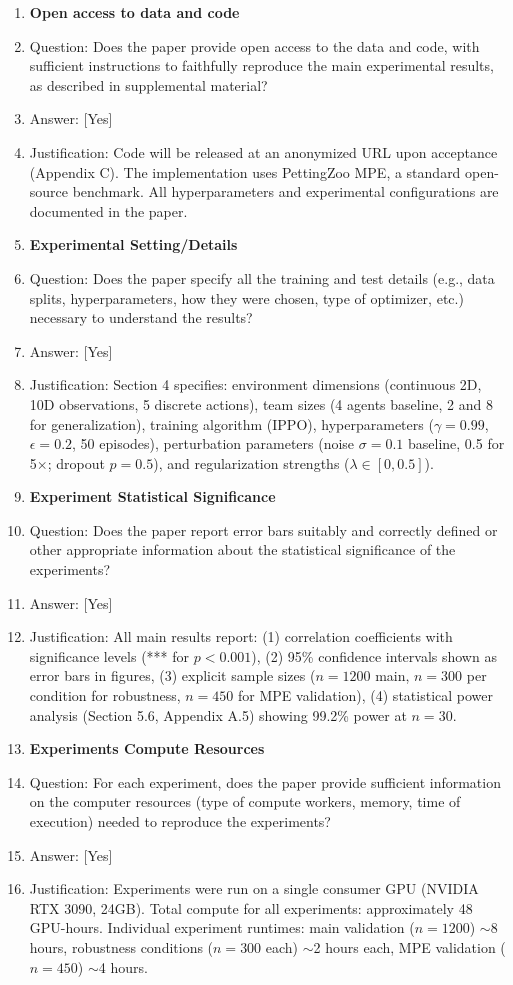 \documentclass[twoside]{article}
\theoremstyle{remark}
\newcommand{\answerYes}{[Yes]}
\begin{document}
\begin{enumerate}
\item {\bf Open access to data and code}
    \item[] Question: Does the paper provide open access to the data and code, with sufficient instructions to faithfully reproduce the main experimental results, as described in supplemental material?
    \item[] Answer: \answerYes{}
    \item[] Justification: Code will be released at an anonymized URL upon acceptance (Appendix C). The implementation uses PettingZoo MPE, a standard open-source benchmark. All hyperparameters and experimental configurations are documented in the paper.

\item {\bf Experimental Setting/Details}
    \item[] Question: Does the paper specify all the training and test details (e.g., data splits, hyperparameters, how they were chosen, type of optimizer, etc.) necessary to understand the results?
    \item[] Answer: \answerYes{}
    \item[] Justification: Section 4 specifies: environment dimensions (continuous 2D, 10D observations, 5 discrete actions), team sizes (4 agents baseline, 2 and 8 for generalization), training algorithm (IPPO), hyperparameters ($\gamma = 0.99$, $\epsilon = 0.2$, 50 episodes), perturbation parameters (noise $\sigma = 0.1$ baseline, 0.5 for 5$\times$; dropout $p = 0.5$), and regularization strengths ($\lambda \in [0, 0.5]$).

\item {\bf Experiment Statistical Significance}
    \item[] Question: Does the paper report error bars suitably and correctly defined or other appropriate information about the statistical significance of the experiments?
    \item[] Answer: \answerYes{}
    \item[] Justification: All main results report: (1) correlation coefficients with significance levels (*** for $p < 0.001$), (2) 95\% confidence intervals shown as error bars in figures, (3) explicit sample sizes ($n = 1200$ main, $n = 300$ per condition for robustness, $n = 450$ for MPE validation), (4) statistical power analysis (Section 5.6, Appendix A.5) showing 99.2\% power at $n = 30$.

\item {\bf Experiments Compute Resources}
    \item[] Question: For each experiment, does the paper provide sufficient information on the computer resources (type of compute workers, memory, time of execution) needed to reproduce the experiments?
    \item[] Answer: \answerYes{}
    \item[] Justification: Experiments were run on a single consumer GPU (NVIDIA RTX 3090, 24GB). Total compute for all experiments: approximately 48 GPU-hours. Individual experiment runtimes: main validation ($n = 1200$) $\sim$8 hours, robustness conditions ($n = 300$ each) $\sim$2 hours each, MPE validation ($n = 450$) $\sim$4 hours.


\end{enumerate}
\end{document}
